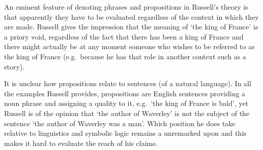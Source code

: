\documentclass{article}
\begin{document}
An eminent feature of denoting phrases and propositions in Russell's theory is 
that apparently they have to be evaluated regardless of the context in which 
they are made. Russell gives the impression that the meaning of `the king of 
France' is a priory void, regardless of the fact that there has been a king of 
France and there might actually be at any moment someone who wishes to be 
referred to as the king of France (e.g.~because he has that role in another
context such as a story).

It is unclear how propositions relate to sentences (of a natural language). In
all the examples Russell provides, propositions are English sentences providing
a noun phrase and assigning a quality to it, e.g.~`the king of France is bald',
yet Russell is of the opinion that `the author of Waverley' is not
the subject of the sentence `the author of Waverley was a man'. Which position
he does take relative to linguistics and symbolic logic remains a unremarked
upon and this makes it hard to evaluate the reach of his claims. 
\end{document}
